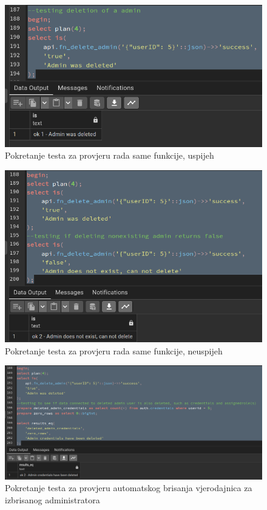 				\begin{figure}[H]
					\centering
					\includegraphics[width=\textwidth]{slike/unit_tests/ut_3/success_invocation.png}
					\caption{Pokretanje testa za provjeru rada same funkcije, uspijeh}
					\label{fig: IS3-uspješno izbrisan administrator}
				\end{figure}
				\begin{figure}[H]
					\centering
					\includegraphics[width=\textwidth]{slike/unit_tests/ut_3/failure_invocation.png}
					\caption{Pokretanje testa za provjeru rada same funkcije, neuspijeh}
					\label{fig: IS3-administrator je već izbrisan ili ne postoji}
				\end{figure}
				\begin{figure}[H]
					\centering
					\includegraphics[width=\textwidth]{slike/unit_tests/ut_3/credentials_deletion.png}
					\caption{Pokretanje testa za provjeru automatskog brisanja vjerodajnica za izbrisanog administratora}
					\label{fig: IS3-brisanje vjerodajnice za obrisanog administratora}
				\end{figure}

